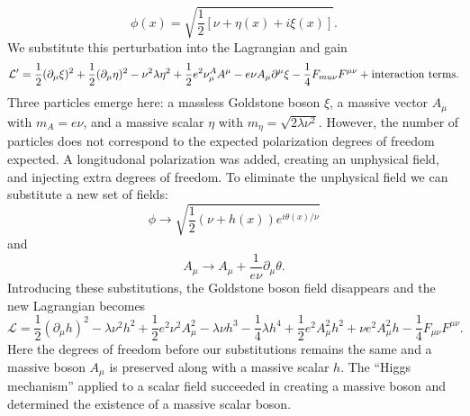 \begin{equation}
\phi(x) =\sqrt{\frac{1}{2}[\nu+\eta(x)+i\xi(x)]}.
\end{equation}
We substitute this perturbation into the Lagrangian and gain
\begin{equation}
\mathcal{L}'=\frac{1}{2}(\partial_\mu\xi)^2+\frac{1}{2}(\partial_\mu\eta)^2-\nu^2\lambda\eta^2+\frac{1}{2}e^2\nu^A_\mu A^\mu-e\nu A_\mu \partial^\mu\xi-\frac{1}{4}F_{mu\nu}F^{\mu\nu} + \textnormal{interaction terms}.
\end{equation}
Three particles emerge here: a massless Goldstone boson $\xi$, a massive vector $A_\mu$ with $m_A=e\nu$, and a massive scalar $\eta$ with $m_\eta=\sqrt{2\lambda\nu^2}$. However, the number of particles does not correspond to the expected polarization degrees of freedom expected. A longitudonal polarization was added, creating an unphysical field, and injecting extra degrees of freedom. To eliminate the unphysical field we can substitute a new set of fields:
\begin{equation}
\phi \rightarrow \sqrt{\frac{1}{2}(\nu+h(x))e^{i\theta(x)/\nu}}
\end{equation}
and 
\begin{equation}
A_\mu \rightarrow A_\mu + \frac{1}{e\nu} \partial_\mu\theta.
\end{equation}
Introducing these substitutions, the Goldstone boson field disappears and the new Lagrangian becomes 
\begin{equation}
\mathcal{L} = \frac{1}{2}(\partial_\mu h)^2 -\lambda\nu^2h^2+\frac{1}{2}e^2\nu^2A_\mu^2-\lambda\nu h^3-\frac{1}{4}\lambda h^4+\frac{1}{2}e^2A_\mu^2h^2+\nu e^2A_\mu^2h-\frac{1}{4}F_{\mu\nu}F^{\mu\nu}.
\end{equation}
Here the degrees of freedom before our substitutions remains the same and a massive boson $A_\mu$ is preserved along with a massive scalar $h$. The ``Higgs mechanism'' applied to a scalar field succeeded in creating a massive boson and determined the existence of a massive scalar boson. 

